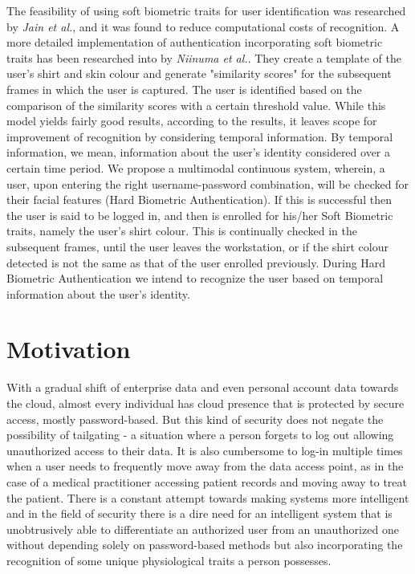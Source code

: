 \documentclass[%
        submission,
        notitlepage,
        narroweqnarray,
        inline,
        ]{ieee}
\begin{document}
The feasibility of using soft biometric traits for user identification was researched by \emph{Jain et al.}\cite{Jain204}, and it was found to reduce computational costs of recognition. A more detailed implementation of authentication incorporating soft biometric traits has been researched into by \emph{Niinuma et al.}\cite{Niin10}. They create a template of the user's shirt and skin colour and generate "similarity scores" for the subsequent frames in which the user is captured. The user is identified based on the comparison of the similarity scores with a certain threshold value. While this model yields fairly good results, according to the results, it leaves scope for improvement of recognition by considering temporal information. By temporal information, we mean, information about the user's identity considered over a certain time period. 
We propose a multimodal continuous system, wherein, a user, upon entering the right username-password combination, will be checked for their facial features (Hard Biometric Authentication). If this is successful then the user is said to be logged in, and then is enrolled for his/her Soft Biometric traits, namely the user's shirt colour. This is continually checked in the subsequent frames, until the user leaves the workstation, or if the shirt colour detected is not the same as that of the user enrolled previously. During Hard Biometric Authentication we intend to recognize the user based on temporal information about the user's identity.

\section{Motivation}
With a gradual shift of enterprise data and even personal account data towards the cloud, almost every individual has cloud presence that is protected by secure access, mostly password-based. But this kind of security does not negate the possibility of tailgating - a situation where a person forgets to log out allowing unauthorized access to their data. It is also cumbersome to log-in multiple times when a user needs to frequently move away from the data access point, as in the case of a medical practitioner accessing patient records and moving away to treat the patient. There is a constant attempt towards making systems more intelligent and in the field of security there is a dire need for an intelligent system that is unobtrusively able to differentiate an authorized user from an unauthorized one without depending solely on password-based methods but also incorporating the recognition of some unique physiological traits a person possesses.
\end{document}
